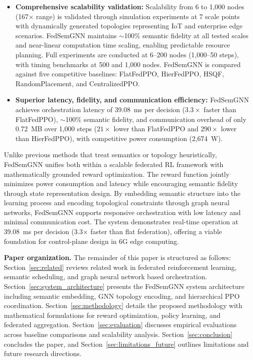 \documentclass[conference]{IEEEtran}
\begin{document}
\begin{itemize}
		\item \textcolor{revblue}{\textbf{Comprehensive scalability validation:} Scalability from 6 to 1{,}000 nodes (167$\times$ range) is validated through simulation experiments at 7 scale points with dynamically generated topologies representing IoT and enterprise edge scenarios. FedSemGNN maintains ${\sim}$100\% semantic fidelity at all tested scales and near-linear computation time scaling, enabling predictable resource planning. Full experiments are conducted at 6--200 nodes (1{,}000--50 steps), with timing benchmarks at 500 and 1{,}000 nodes. FedSemGNN is compared against five competitive baselines: FlatFedPPO, HierFedPPO, HSQF, RandomPlacement, and CentralizedPPO.}
		
		\item \textcolor{revblue}{\textbf{Superior latency, fidelity, and communication efficiency:} FedSemGNN achieves orchestration latency of 39.08~ms per decision ($3.3\times$ faster than FlatFedPPO), $\sim$100\% semantic fidelity, and communication overhead of only 0.72~MB over 1{,}000 steps ($21\times$ lower than FlatFedPPO and $290\times$ lower than HierFedPPO), with competitive power consumption (2{,}674~W).}
	\end{itemize}
	
	\textcolor{revblue}{Unlike previous methods that treat semantics or topology heuristically, FedSemGNN unifies both within a scalable federated RL framework with mathematically grounded reward optimization. The reward function jointly minimizes power consumption and latency while encouraging semantic fidelity through state representation design. By embedding semantic structure into the learning process and encoding topological constraints through graph neural networks, FedSemGNN supports responsive orchestration with low latency and minimal communication cost. The system demonstrates real-time operation at 39.08~ms per decision (3.3$\times$ faster than flat federation), offering a viable foundation for control-plane design in 6G edge computing.}
	
	\noindent\textbf{Paper organization.} The remainder of this paper is structured as follows: Section~\ref{sec:related} reviews related work in federated reinforcement learning, semantic scheduling, and graph neural network based orchestration. Section~\ref{sec:system_architecture} presents the FedSemGNN system architecture including semantic embedding, GNN topology encoding, and hierarchical PPO coordination. Section~\ref{sec:methodology} details the proposed methodology with mathematical formulations for reward optimization, policy learning, and federated aggregation. Section~\ref{sec:evaluation} discusses empirical evaluations across baseline comparisons and scalability analysis. Section~\ref{sec:conclusion} concludes the paper, and Section~\ref{sec:limitations_future} outlines limitations and future research directions.
	
\end{document}
